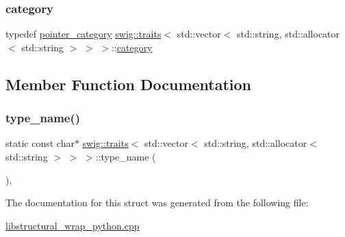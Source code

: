 \subsubsection{\texorpdfstring{category}{category}}
{\footnotesize\ttfamily typedef \hyperlink{structswig_1_1pointer__category}{pointer\+\_\+category} \hyperlink{structswig_1_1traits}{swig\+::traits}$<$ std\+::vector$<$ std\+::string, std\+::allocator$<$ std\+::string $>$ $>$ $>$\+::\hyperlink{structswig_1_1traits_3_01std_1_1vector_3_01std_1_1string_00_01std_1_1allocator_3_01std_1_1string_01_4_01_4_01_4_a888c5f49b4d76c1791d18b280dc89af6}{category}}



\subsection{Member Function Documentation}
\mbox{\label{structswig_1_1traits_3_01std_1_1vector_3_01std_1_1string_00_01std_1_1allocator_3_01std_1_1string_01_4_01_4_01_4_a9196f04cf4a0e459d368b9f457bb96f0}} 
\subsubsection{\texorpdfstring{type\+\_\+name()}{type\_name()}}
{\footnotesize\ttfamily static const char$\ast$ \hyperlink{structswig_1_1traits}{swig\+::traits}$<$ std\+::vector$<$ std\+::string, std\+::allocator$<$ std\+::string $>$ $>$ $>$\+::type\+\_\+name (\begin{DoxyParamCaption}{ }\end{DoxyParamCaption})\hspace{0.3cm}{\ttfamily [inline]}, {\ttfamily [static]}}



The documentation for this struct was generated from the following file\+:\begin{DoxyCompactItemize}
\item 
\hyperlink{libstructural__wrap__python_8cpp}{libstructural\+\_\+wrap\+\_\+python.\+cpp}\end{DoxyCompactItemize}
